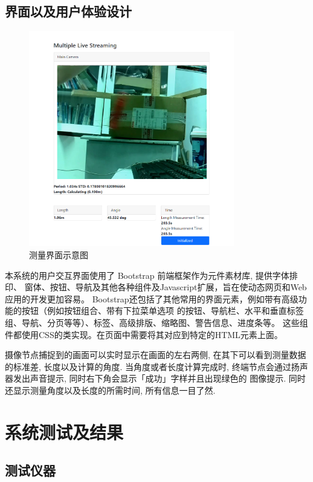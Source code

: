 \documentclass[scheme=chinese,a4paper]{article}
\begin{document}
\subsection{界面以及用户体验设计}
\begin{figure}[H]
  \centering
  \includegraphics[width=0.8\textwidth]{interface.png}
  \caption{测量界面示意图}
\end{figure}

本系统的用户交互界面使用了 Bootstrap 前端框架作为元件素材库, 提供字体排印、
窗体、按钮、导航及其他各种组件及Javascript扩展，旨在使动态网页和Web应用的开发更加容易。
Bootstrap还包括了其他常用的界面元素，例如带有高级功能的按钮（例如按钮组合、带有下拉菜单选项
的按钮、导航栏、水平和垂直标签组、导航、分页等等）、标签、高级排版、缩略图、警告信息、进度条等。
这些组件都使用CSS的类实现。在页面中需要将其对应到特定的HTML元素上面。

摄像节点捕捉到的画面可以实时显示在画面的左右两侧, 在其下可以看到测量数据的标准差, 长度以及计算的角度. 
当角度或者长度计算完成时, 终端节点会通过扬声器发出声音提示, 同时右下角会显示「成功」字样并且出现绿色的
图像提示. 同时还显示测量角度以及长度的所需时间, 所有信息一目了然. 

\section{系统测试及结果}
\subsection{测试仪器}
\end{document}
